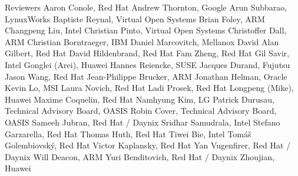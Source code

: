\begin{oasistitlesection}{Reviewers}
Aaron Conole,	Red Hat	\newline
Andrew Thornton,  Google \newline
Arun Subbarao,	LynuxWorks	\newline
Baptiste Reynal,	Virtual Open Systems	\newline
Brian Foley,  ARM \newline
Changpeng Liu,	Intel	\newline
Christian Pinto,	Virtual Open Systems	\newline
Christoffer Dall,	ARM	\newline
Christian Borntraeger,	IBM	\newline
Daniel Marcovitch,	Mellanox	\newline
David Alan Gilbert, Red Hat \newline
David Hildenbrand,	Red Hat	\newline
Fam Zheng, Red Hat	\newline
Gil Savir,	Intel	\newline
Gonglei (Arei),	Huawei	\newline
Hannes Reiencke, SUSE	\newline
Jacques Durand,	Fujutsu	\newline
Jason Wang, Red Hat \newline
Jean-Philippe Brucker,	ARM	\newline
Jonathan Helman,	Oracle	\newline
Kevin Lo,	MSI	\newline
Laura Novich, Red Hat	\newline
Ladi Prosek,	Red Hat	\newline
Longpeng (Mike),	Huawei	\newline
Maxime Coquelin,	Red Hat	\newline
Namhyung Kim,	LG	\newline
Patrick Durusau,	Technical Advisory Board, OASIS	\newline
Robin Cover,	Technical Advisory Board, OASIS	\newline
Sameeh Jubran,	Red Hat / Daynix	\newline
Sridhar Samudrala,	Intel	\newline
Stefano Garzarella,	Red Hat	\newline
Thomas Huth,	Red Hat	\newline
Tiwei Bie,	Intel	\newline
Tomáš Golembiovský,	Red Hat	\newline
Victor Kaplansky,	Red Hat	\newline
Yan Vugenfirer, Red Hat / Daynix	\newline
Will Deacon,	ARM	\newline
Yuri Benditovich,	Red Hat / Daynix	\newline
Zhoujian,	Huawei	\newline
\end{oasistitlesection}
